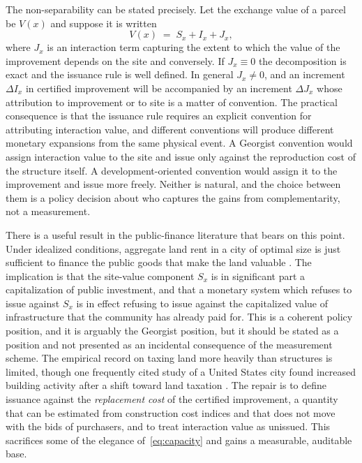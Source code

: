 \documentclass[11pt]{article}
\theoremstyle{definition}
\begin{document}
The non-separability can be stated precisely. Let the exchange value of a parcel be $V(x)$ and suppose it is written
\begin{equation}
V(x) \;=\; S_x + I_x + J_x,
\label{eq:interaction}
\end{equation}
where $J_x$ is an interaction term capturing the extent to which the value of the improvement depends on the site and conversely. If $J_x\equiv 0$ the decomposition is exact and the issuance rule is well defined. In general $J_x\neq 0$, and an increment $\Delta I_x$ in certified improvement will be accompanied by an increment $\Delta J_x$ whose attribution to improvement or to site is a matter of convention. The practical consequence is that the issuance rule requires an explicit convention for attributing interaction value, and different conventions will produce different monetary expansions from the same physical event. A Georgist convention would assign interaction value to the site and issue only against the reproduction cost of the structure itself. A development-oriented convention would assign it to the improvement and issue more freely. Neither is natural, and the choice between them is a policy decision about who captures the gains from complementarity, not a measurement.

There is a useful result in the public-finance literature that bears on this point. Under idealized conditions, aggregate land rent in a city of optimal size is just sufficient to finance the public goods that make the land valuable \cite{arnott1979}. The implication is that the site-value component $S_x$ is in significant part a capitalization of public investment, and that a monetary system which refuses to issue against $S_x$ is in effect refusing to issue against the capitalized value of infrastructure that the community has already paid for. This is a coherent policy position, and it is arguably the Georgist position, but it should be stated as a position and not presented as an incidental consequence of the measurement scheme. The empirical record on taxing land more heavily than structures is limited, though one frequently cited study of a United States city found increased building activity after a shift toward land taxation \cite{oates1997}. The repair is to define issuance against the \emph{replacement cost} of the certified improvement, a quantity that can be estimated from construction cost indices and that does not move with the bids of purchasers, and to treat interaction value as unissued. This sacrifices some of the elegance of~\eqref{eq:capacity} and gains a measurable, auditable base.
\end{document}
